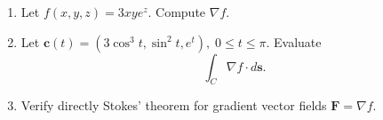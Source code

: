 \documentclass[openany]{book}
\begin{document}
\begin{prob}[13]
    \begin{enumerate}
        \item[(a)] Let \( f(x, y, z) = 3xy e^z \). Compute \( \nabla f \).  
        \item[(b)] Let \( \mathbf{c}(t) = (3 \cos^3 t, \sin^2 t, e^t), \; 0 \leq t \leq \pi \). Evaluate
        \[
        \int_C \nabla f \cdot d\mathbf{s}.
        \]
        \item[(c)] Verify directly Stokes' theorem for gradient vector fields \( \mathbf{F} = \nabla f \).
    \end{enumerate}
\end{prob}
\end{document}
